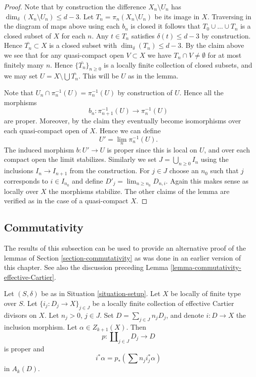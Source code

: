 \begin{proof}
\medskip\noindent
Note that by construction the difference $X_n \setminus U_n$
has $\dim_\delta(X_n \setminus U_n) \leq d - 3$.
Let $T_n = \pi_n(X_n \setminus U_n)$ be its image in $X$.
Traversing in the diagram of maps above using each $b_n$ is closed
it follows that $T_0 \cup \ldots \cup T_n$ is a closed subset of $X$
for each $n$. Any $t \in T_n$ satisfies $\delta(t) \leq d - 3$
by construction. Hence $\overline{T_n} \subset X$ is a closed subset
with $\dim_\delta(T_n) \leq d - 3$. By the claim above we see
that for any quasi-compact open $V \subset X$ we have
$T_n \cap V \not = \emptyset$ for at most finitely many $n$.
Hence $\{\overline{T_n}\}_{n \geq 0}$ is a locally finite
collection of closed subsets, and we may set
$U = X \setminus \bigcup \overline{T_n}$. This will be
$U$ as in the lemma.

\medskip\noindent
Note that $U_n \cap \pi_n^{-1}(U) = \pi_n^{-1}(U)$ by construction
of $U$. Hence all the morphisms
$$
b_n : \pi_{n + 1}^{-1}(U) \longrightarrow \pi_n^{-1}(U)
$$
are proper. Moreover, by the claim they eventually become isomorphisms
over each quasi-compact open of $X$. Hence we can define
$$
U' = \lim_n \pi_n^{-1}(U).
$$
The induced morphism $b : U' \to U$ is proper since this is local
on $U$, and over each compact open the limit stabilizes. Similarly
we set $J = \bigcup_{n \geq 0} I_n$ using the inclusions
$I_n \to I_{n + 1}$ from the construction. For $j \in J$ choose
an $n_0$ such that $j$ corresponds to $i \in I_{n_0}$ and define
$D'_j = \lim_{n \geq n_0} D_{n, i}$. Again this makes sense
as locally over $X$ the morphisms stabilize.
The other claims of the lemma are verified as in the case
of a quasi-compact $X$.
\end{proof}


\subsection{Commutativity}
\label{subsection-commutativity}

\noindent
The results of this subsection can be used to provide an alternative
proof of the lemmas of Section \ref{section-commutativity} as was
done in an earlier version of this chapter. See also the discussion
preceding Lemma \ref{lemma-commutativity-effective-Cartier}.

\begin{lemma}
\label{lemma-improved-additivity}
Let $(S, \delta)$ be as in Situation \ref{situation-setup}.
Let $X$ be locally of finite type over $S$.
Let $\{i_j : D_j \to X \}_{j \in J}$ be a locally finite collection
of effective Cartier divisors on $X$. Let $n_j > 0$, $j\in J$.
Set $D = \sum_{j \in J} n_j D_j$, and denote $i : D \to X$ the
inclusion morphism. Let $\alpha \in Z_{k + 1}(X)$. Then
$$
p : \coprod\nolimits_{j \in J} D_j \longrightarrow D
$$
is proper and
$$
i^*\alpha = p_*\left(\sum n_j i_j^*\alpha\right)
$$
in $A_k(D)$.
\end{lemma}

